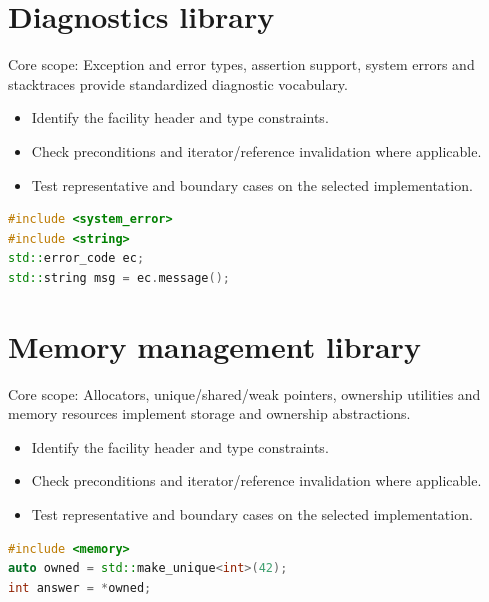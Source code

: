 \documentclass[11pt]{article}
\begin{document}
\section{Diagnostics library}
Core scope: Exception and error types, assertion support, system errors and stacktraces provide standardized diagnostic vocabulary.

\begin{itemize}[leftmargin=*,itemsep=1pt,topsep=3pt]
\item Identify the facility header and type constraints.
\item Check preconditions and iterator/reference invalidation where applicable.
\item Test representative and boundary cases on the selected implementation.
\end{itemize}
\begin{lstlisting}[language=C++]
#include <system_error>
#include <string>
std::error_code ec;
std::string msg = ec.message();
\end{lstlisting}
\section{Memory management library}
Core scope: Allocators, unique/shared/weak pointers, ownership utilities and memory resources implement storage and ownership abstractions.

\begin{itemize}[leftmargin=*,itemsep=1pt,topsep=3pt]
\item Identify the facility header and type constraints.
\item Check preconditions and iterator/reference invalidation where applicable.
\item Test representative and boundary cases on the selected implementation.
\end{itemize}
\begin{lstlisting}[language=C++]
#include <memory>
auto owned = std::make_unique<int>(42);
int answer = *owned;
\end{lstlisting}
\end{document}
